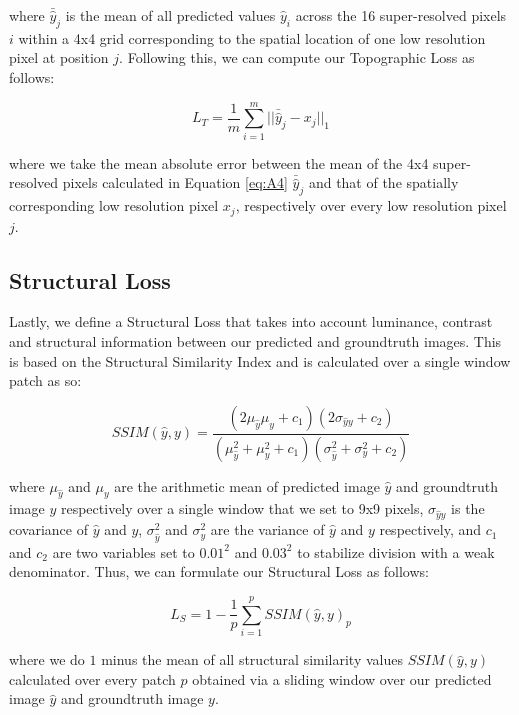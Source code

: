 \documentclass[tc, manuscript]{copernicus}
\begin{document}
where $\bar{\hat{y}}_j$ is the mean of all predicted values $\hat{y}_i$ across the 16 super-resolved pixels $i$ within a 4x4 grid corresponding to the spatial location of one low resolution pixel at position $j$.
Following this, we can compute our Topographic Loss as follows:

\begin{equation}\label{eq:A5}
  L_T = \dfrac{1}{m} \sum\limits_{i=1}^m ||\bar{\hat{y}}_j - x_j||_{1}
\end{equation}

where we take the mean absolute error between the mean of the 4x4 super-resolved pixels calculated in Equation \eqref{eq:A4} $\bar{\hat{y}}_j$ and that of the spatially corresponding low resolution pixel $x_j$, respectively over every low resolution pixel $j$.

\subsection{Structural Loss}

Lastly, we define a Structural Loss that takes into account luminance, contrast and structural information between our predicted and groundtruth images.
This is based on the Structural Similarity Index \citep[SSIM,][]{WangImageQualityAssessment2004} and is calculated over a single window patch as so:

\begin{equation}\label{eq:A6}
  SSIM(\hat{y}, y) = \dfrac{(2\mu_{\hat{y}}\mu_y + c_1)(2\sigma_{{\hat{y}}y} + c_2)}{(\mu_{\hat{y}}^2 + \mu_y^2 + c_1)(\sigma_{\hat{y}}^2 + \sigma_y^2 + c_2)}
\end{equation}

where $\mu_{\hat{y}}$ and $\mu_y$ are the arithmetic mean of predicted image ${\hat{y}}$ and groundtruth image $y$ respectively over a single window that we set to 9x9 pixels, $\sigma_{{\hat{y}}y}$ is the covariance of ${\hat{y}}$ and $y$, $\sigma_{\hat{y}}^2$ and $\sigma_y^2$ are the variance of ${\hat{y}}$ and $y$ respectively, and $c_1$ and $c_2$ are two variables set to $0.01^2$ and $0.03^2$ to stabilize division with a weak denominator.
Thus, we can formulate our Structural Loss as follows:

\begin{equation}\label{eq:A7}
  L_S = 1 - \dfrac{1}{p} \sum\limits_{i=1}^p SSIM(\hat{y}, y)_p
\end{equation}

where we do $1$ minus the mean of all structural similarity values $SSIM(\hat{y}, y)$ calculated over every patch $p$ obtained via a sliding window over our predicted image ${\hat{y}}$ and groundtruth image $y$.
\end{document}
